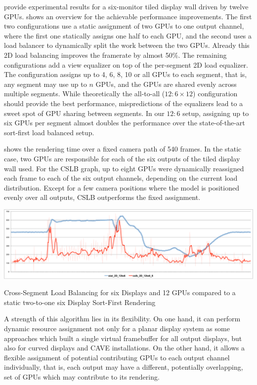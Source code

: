 \cite{EEP:11} provide experimental results for a six-monitor tiled display wall
driven by twelve GPUs.  shows an overview for the achievable
performance improvements. The first two configurations use a static assignment
of two GPUs to one output channel, where the first one statically assigns one
half to each GPU, and the second uses a load balancer to dynamically split the
work between the two GPUs. Already this 2D load balancing improves the
framerate by almost 50\%. The remaining configurations add a view equalizer on
top of the per-segment 2D load equalizer. The configuration assigns up to 4, 6,
8, 10 or all GPUs to each segment, that is, any segment may use up to $n$ GPUs,
and the GPUs are shared evenly across multiple segments. While theoretically
the all-to-all ($12:6\times 12$) configuration should provide the best
performance, mispredictions of the equalizers lead to a sweet spot of GPU
sharing between segments. In our $12:6$ setup, assigning up to six GPUs per
segment almost doubles the performance over the state-of-the-art sort-first
load balanced setup.

 shows the rendering time over a fixed camera path of 540 frames.
In the static case, two GPUs are responsible for each of the six outputs of the
tiled display wall used. For the CSLB graph, up to eight GPUs were dynamically
reassigned each frame to each of the six output channels, depending on the
current load distribution. Except for a few camera positions where the model is
positioned evenly over all outputs, CSLB outperforms the fixed assignment.

\begin{benchmark}[h!t]
  \centering
  \includegraphics[width=\textwidth]{results/cslb}
  \caption{Cross-Segment Load Balancing for six Displays and 12 GPUs compared to a static two-to-one six Display Sort-First Rendering}
  \label{rCSLB}
\end{benchmark}

A strength of this algorithm lies in its flexibility. On one hand, it can
perform dynamic resource assignment not only for a planar display system as
some approaches which built a single virtual framebuffer for all output
displays, but also for curved displays and CAVE installations. On the other
hand, it allows a flexible assignment of potential contributing GPUs to each
output channel individually, that is, each output may have a different,
potentially overlapping, set of GPUs which may contribute to its rendering.

